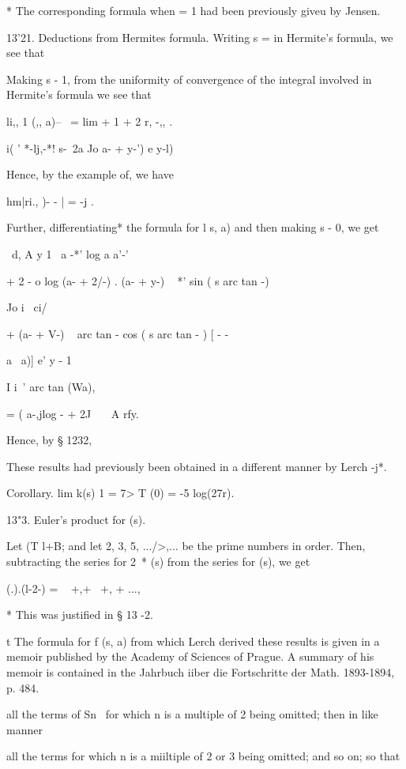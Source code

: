 * The corresponding formula when = 1 had been previously giveu by
Jensen.

%
%

13'21. Deductions from Hermites formula. Writing s = in Hermite's
formula, we see that

Making s - 1, from the uniformity of convergence of the integral
involved in Hermite's formula we see that

li,, 1 (,, a)-- \ = lim + 1 + 2 r, -,, .

  i( ' *-lj,-*! s-\ 2a Jo a- + y-') e y-l)

Hence, by the example of, we have

hm|ri., )- - | = -j .

Further, differentiating* the formula for l s, a) and then making s -
0, we get

\ d, A y 1 \, a -*' log a a'-'

+ 2 - o log (a- + 2/-) . (a- + y-) ~ *' sin ( s arc tan -)

Jo i \ ci/

+ (a- + V-) ~ arc tan - cos ( s arc tan - ) [ - -

    a \ a)] e' y - 1

I i\, ' arc tan (Wa),

= ( a-,jlog - + 2J \ \ \ A rfy.

Hence, by § 1232,

These results had previously been obtained in a different manner by
Lerch -j*.

Corollary. lim k(s) 1 = 7> T (0) = -5 log(27r).

13"3. Euler's product for (s).

Let (T l+B; and let 2, 3, 5, .../>,... be the prime numbers in order.
Then, subtracting the series for 2~* (s) from the series for (s), we
get

 (.).(l-2-) = ~ +,+~ +, + ...,

* This was justified in § 13 -2.

t The formula for f (s, a) from which Lerch derived these results is
given in a memoir published by the Academy of Sciences of Prague. A
summary of his memoir is contained in the Jahrbuch iiber die
Fortschritte der Math. 1893-1894, p. 484.

%
%

all the terms of Sn~ for which n is a multiple of 2 being omitted;
then in like manner

all the terms for which n is a miiltiple of 2 or 3 being omitted; and
so on; so that

